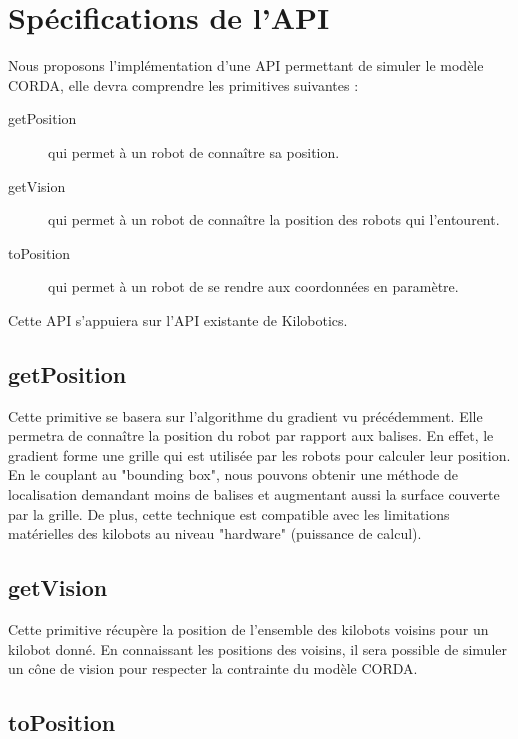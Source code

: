 \documentclass[a4paper,8pt]{report}
\begin{document}
\section*{Sp\'ecifications de l'API}\label{sec:name}

Nous proposons l'impl\'ementation d'une API permettant de simuler le mod\`ele CORDA, elle devra comprendre les primitives suivantes :

\begin{description}
\item[getPosition] qui permet \`a un robot de conna\^itre sa position.
\item[getVision] qui permet \`a un robot de conna\^itre la position des robots qui l'entourent.
\item[toPosition] qui permet \`a un robot de se rendre aux coordonn\'ees en param\`etre.
\end{description}

\smallskip
Cette API s'appuiera sur l'API existante de Kilobotics.\\

\subsection*{getPosition}\label{sec:name}

Cette primitive se basera sur l'algorithme du gradient vu précédemment. Elle permetra de connaître la position du robot par rapport aux balises. En effet, le gradient forme une grille qui est utilisée par les robots pour calculer leur position. En le couplant au "bounding box", nous pouvons obtenir une méthode de localisation demandant moins de balises et augmentant aussi la surface couverte par la grille. De plus, cette technique est compatible avec les limitations matérielles des kilobots au niveau "hardware" (puissance de calcul).

\subsection*{getVision}\label{sec:name}

Cette primitive récupère la position de l'ensemble des kilobots voisins pour un kilobot donné. En connaissant les positions des voisins, il sera possible de simuler un cône de vision pour respecter la contrainte du modèle CORDA.

\subsection*{toPosition}\label{sec:name}
\end{document}
